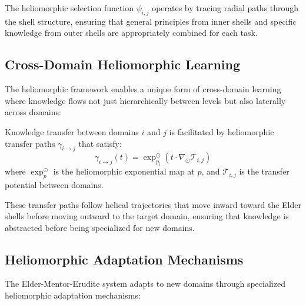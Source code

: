 The heliomorphic selection function $\psi_{i,j}$ operates by tracing radial paths through the shell structure, ensuring that general principles from inner shells and specific knowledge from outer shells are appropriately combined for each task.

\subsection{Cross-Domain Heliomorphic Learning}

The heliomorphic framework enables a unique form of cross-domain learning where knowledge flows not just hierarchically between levels but also laterally across domains:

\begin{theorem}
Knowledge transfer between domains $i$ and $j$ is facilitated by heliomorphic transfer paths $\gamma_{i \to j}$ that satisfy:
\begin{equation}
\gamma_{i \to j}(t) = \exp_{p_i}^{\odot}\left(t \cdot \nabla_{\odot} \mathcal{T}_{i,j}\right)
\end{equation}
where $\exp_{p}^{\odot}$ is the heliomorphic exponential map at $p$, and $\mathcal{T}_{i,j}$ is the transfer potential between domains.
\end{theorem}

These transfer paths follow helical trajectories that move inward toward the Elder shells before moving outward to the target domain, ensuring that knowledge is abstracted before being specialized for new domains.

\subsection{Heliomorphic Adaptation Mechanisms}

The Elder-Mentor-Erudite system adapts to new domains through specialized heliomorphic adaptation mechanisms:

